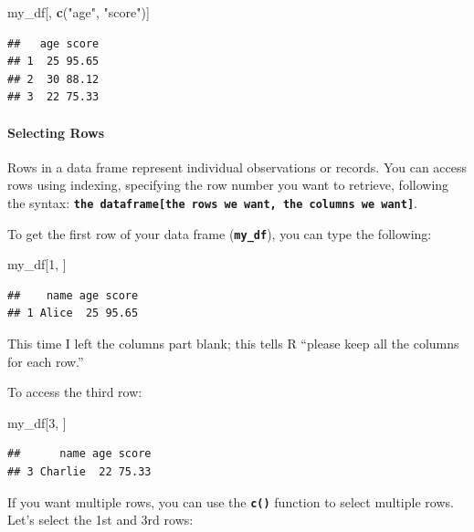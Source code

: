 \documentclass[
]{book}
\newenvironment{Shaded}{\begin{snugshade}}{\end{snugshade}}
\newcommand{\DecValTok}[1]{\textcolor[rgb]{0.00,0.00,0.81}{#1}}
\newcommand{\FunctionTok}[1]{\textcolor[rgb]{0.13,0.29,0.53}{\textbf{#1}}}
\newcommand{\NormalTok}[1]{#1}
\newcommand{\StringTok}[1]{\textcolor[rgb]{0.31,0.60,0.02}{#1}}
\begin{document}
\begin{Shaded}
\begin{Highlighting}[]
\NormalTok{my\_df[, }\FunctionTok{c}\NormalTok{(}\StringTok{"age"}\NormalTok{, }\StringTok{"score"}\NormalTok{)]}
\end{Highlighting}
\end{Shaded}

\begin{verbatim}
##   age score
## 1  25 95.65
## 2  30 88.12
## 3  22 75.33
\end{verbatim}

\paragraph{Selecting Rows}\label{selecting-rows}

Rows in a data frame represent individual observations or records. You can access rows using indexing, specifying the row number you want to retrieve, following the syntax: \textbf{\texttt{the\ dataframe{[}the\ rows\ we\ want,\ the\ columns\ we\ want{]}}}.

To get the first row of your data frame (\textbf{\texttt{my\_df}}), you can type the following:

\begin{Shaded}
\begin{Highlighting}[]
\NormalTok{my\_df[}\DecValTok{1}\NormalTok{, ]}
\end{Highlighting}
\end{Shaded}

\begin{verbatim}
##    name age score
## 1 Alice  25 95.65
\end{verbatim}

This time I left the columns part blank; this tells R ``please keep all the columns for each row.''

To access the third row:

\begin{Shaded}
\begin{Highlighting}[]
\NormalTok{my\_df[}\DecValTok{3}\NormalTok{, ]}
\end{Highlighting}
\end{Shaded}

\begin{verbatim}
##      name age score
## 3 Charlie  22 75.33
\end{verbatim}

If you want multiple rows, you can use the \textbf{\texttt{c()}} function to select multiple rows. Let's select the 1st and 3rd rows:
\end{document}
